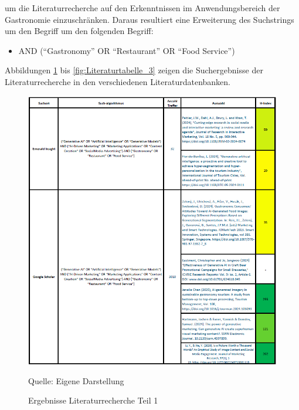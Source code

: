 um die Literaturrecherche auf den Erkenntnissen im Anwendungsbereich der Gastronomie einzuschränken.
Daraus resultiert eine Erweiterung des Suchstrings um den Begriff um den folgenden Begriff:

\begin{itemize}
    \item AND (``Gastronomy'' OR ``Restaurant'' OR ``Food Service'')
\end{itemize}

Abbildungen \ref{fig:Literaturtabelle_1} bis \ref{fig:Literaturtabelle_3} zeigen die Suchergebnisse der Literaturrecherche in den verschiedenen Literaturdatenbanken.

\begin{figure}[htbp]
    \centering
    \includegraphics[width=\textwidth]{abbildungen/Literaturtabelle_1}
    \caption{Ergebnisse Literaturrecherche Teil 1}
    \label{fig:Literaturtabelle_1}
    \raggedright Quelle: Eigene Darstellung
\end{figure}

